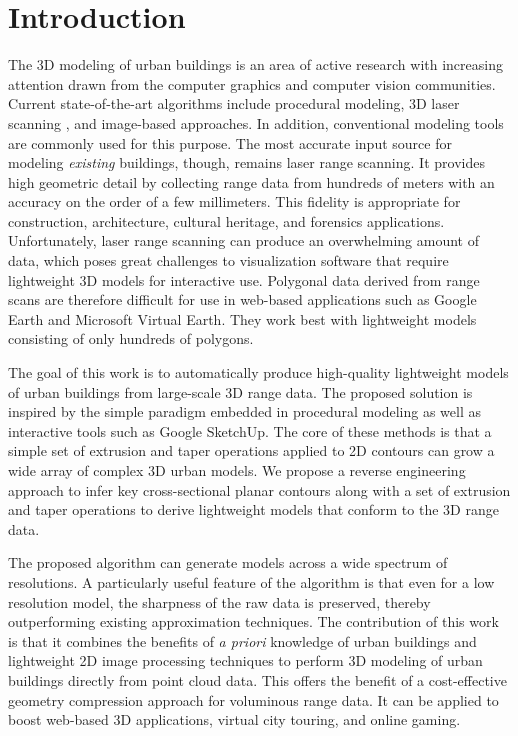 \documentclass{acmsiggraph}                     %
\begin{document}
\section{Introduction}
The 3D modeling of urban buildings is an area of active research
with increasing attention drawn from the computer graphics and
computer vision communities.
Current state-of-the-art algorithms include procedural modeling,
3D laser scanning \cite{RDP_LRS}, and image-based approaches.
In addition, conventional modeling tools are commonly used for this purpose.
The most accurate input source for modeling {\it existing} buildings, though,
remains laser range scanning.
It provides high geometric detail by collecting range data from hundreds
of meters with an accuracy on the order of a few millimeters.
This fidelity is appropriate for construction, architecture, cultural
heritage, and forensics applications.
Unfortunately, laser range scanning can produce an overwhelming amount of data,
which poses great challenges to visualization software that require lightweight
3D models for interactive use.
Polygonal data derived from range scans are therefore difficult for use in
web-based applications such as Google Earth and Microsoft Virtual Earth.
They work best with lightweight models consisting of only hundreds of polygons.


The goal of this work is to automatically produce high-quality
lightweight models of urban buildings from large-scale 3D range data.
The proposed solution is inspired by the simple paradigm embedded in
procedural modeling as well as interactive tools such as Google SketchUp.
The core of these methods is that a simple set of extrusion and taper
operations applied to 2D contours can grow a wide array of complex 3D urban
models.
We propose a reverse engineering approach to infer key cross-sectional
planar contours along with a set of extrusion and taper operations to derive
lightweight models that conform to the 3D range data.

The proposed algorithm can generate models across a wide spectrum of
resolutions.
A particularly useful feature of the algorithm is that even for a low
resolution model, the sharpness of the raw data is preserved, thereby
outperforming existing approximation techniques.
The contribution of this work is that it combines the benefits of
\emph{a priori} knowledge of urban buildings and lightweight 2D image
processing techniques to perform 3D modeling of urban buildings directly
from point cloud data.
This offers the benefit of a cost-effective geometry compression
approach for voluminous range data.
It can be applied to boost web-based 3D applications, virtual city touring,
and online gaming.
\end{document}
